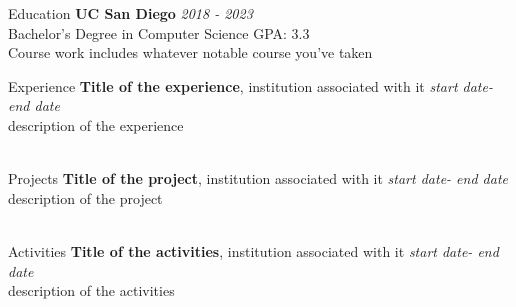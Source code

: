 


	\begin{rSection}{Education}
		{\bf UC San Diego} \hfill {\em 2018 - 2023} 
		\\ Bachelor's Degree in Computer Science\hfill { GPA: 3.3 }
		\\ Course work includes whatever notable course you've taken
		\\

	\end{rSection}
		\begin{rSection}{Experience}
		{\bf Title of the experience}{, institution associated with it} \hfill {\em start date- end date}\\
		description of the experience\\\\
	\end{rSection}
	\begin{rSection}{Projects}
		{\bf Title of the project}{, institution associated with it} \hfill {\em start date- end date}\\
		description of the project\\\\
	\end{rSection}
	\begin{rSection}{Activities}
		{\bf Title of the activities}{, institution associated with it} \hfill {\em start date- end date}\\
		description of the activities\\\\
	\end{rSection}
